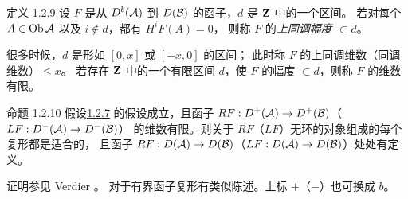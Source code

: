\begin{enonce*}{定义 1.2.9}
设 $F$ 是从 $D^{b}({\mathcal A})$ 到 $D({\mathcal B})$ 的函子，$d$ 是 $\mathbf{Z}$ 中的一个区间。
若对每个 $A\in \operatorname{Ob} {\mathcal A}$ 以及 $i\not\in d$，都有 $H^{i}F(A)=0$，
则称 $F$ 的\emph{上同调幅度 $\subset d$}。
\end{enonce*}

很多时候，$d$ 是形如 $[0,x]$ 或 $[-x,0]$ 的区间；
此时称 $F$ 的上同调维数（\resp 同调维数）$\leq x$。
若存在 $\mathbf{Z}$ 中的一个有限区间 $d$，使 $F$ 的幅度 $\subset d$，则称 $F$ 的维数有限。

\begin{enonce*}{命题 1.2.10}
假设\pageoriginale \hyperref[XVII.prop1.2.7]{1.2.7} 的假设成立，且函子
$RF:D^{+}({\mathcal A})\rightarrow D^{+}({\mathcal B})$（\resp $LF:D^{-}({\mathcal A})\rightarrow D^{-}({\mathcal B})$）
的维数有限。则关于 $RF$（\resp $LF$）无环的对象组成的每个复形都是适合的，
且函子 $RF:D({\mathcal A})\rightarrow D({\mathcal B})$（\resp $LF:D({\mathcal A})\rightarrow D({\mathcal B})$）处处有定义。
\end{enonce*}

证明参见 Verdier \cite{sga4.exp.XVII.bib.CD}。
对于有界函子复形有类似陈述。上标 $+$（\resp $-$）也可换成 $b$。
